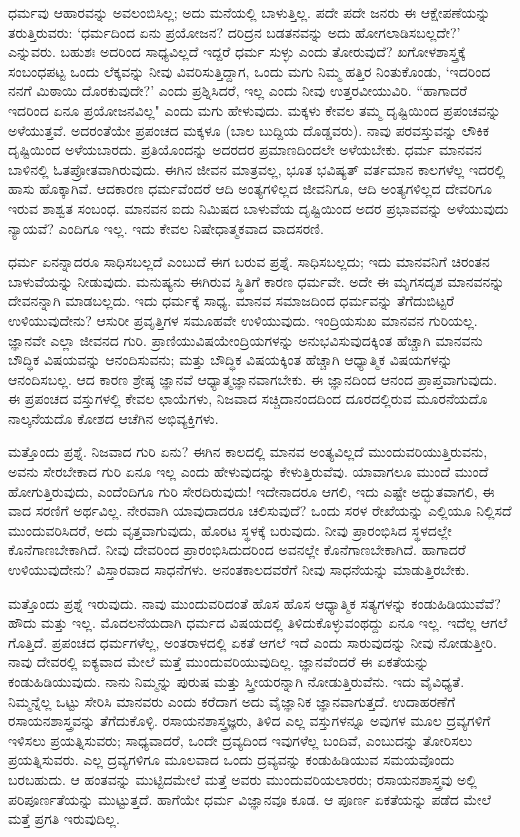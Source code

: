 ಧರ್ಮವು ಆಹಾರವನ್ನು ಅವಲಂಬಿಸಿಲ್ಲ; ಅದು ಮನೆಯಲ್ಲಿ ಬಾಳುತ್ತಿಲ್ಲ. ಪದೇ ಪದೇ ಜನರು ಈ ಆಕ್ಷೇಪಣೆಯನ್ನು ತರುತ್ತಿರುವರು: `ಧರ್ಮದಿಂದ ಏನು ಪ್ರಯೋಜನ? ದರಿದ್ರನ ಬಡತನವನ್ನು ಅದು ಹೋಗಲಾಡಿಸಬಲ್ಲದೇ?' ಎನ್ನುವರು. ಬಹುಶಃ ಅದರಿಂದ ಸಾಧ್ಯವಿಲ್ಲದೆ ಇದ್ದರೆ ಧರ್ಮ ಸುಳ್ಳು ಎಂದು ತೋರುವುದೆ? ಖಗೋಳಶಾಸ್ತ್ರಕ್ಕೆ ಸಂಬಂಧಪಟ್ಟ ಒಂದು ಲೆಕ್ಕವನ್ನು ನೀವು ವಿವರಿಸುತ್ತಿದ್ದಾಗ, ಒಂದು ಮಗು ನಿಮ್ಮ ಹತ್ತಿರ ನಿಂತುಕೊಂಡು, `ಇದರಿಂದ ನನಗೆ ಮಿಠಾಯಿ ದೊರಕುವುದೇ?' ಎಂದು ಪ್ರಶ್ನಿಸಿದರೆ, ಇಲ್ಲ ಎಂದು ನೀವು ಉತ್ತರವೀಯುವಿರಿ. “ಹಾಗಾದರೆ ಇದರಿಂದ ಏನೂ ಪ್ರಯೋಜನವಿಲ್ಲ" ಎಂದು ಮಗು ಹೇಳುವುದು. ಮಕ್ಕಳು ಕೇವಲ ತಮ್ಮ ದೃಷ್ಟಿಯಿಂದ ಪ್ರಪಂಚವನ್ನು ಅಳೆಯುತ್ತವೆ. ಅದರಂತೆಯೇ ಪ್ರಪಂಚದ ಮಕ್ಕಳೂ (ಬಾಲ ಬುದ್ದಿಯ ದೊಡ್ಡವರು). ನಾವು ಪರವಸ್ತುವನ್ನು ಲೌಕಿಕ ದೃಷ್ಟಿಯಿಂದ ಅಳೆಯಬಾರದು. ಪ್ರತಿಯೊಂದನ್ನು ಅದರದರ ಪ್ರಮಾಣದಿಂದಲೇ ಅಳೆಯಬೇಕು. ಧರ್ಮ ಮಾನವನ ಬಾಳಿನಲ್ಲಿ ಓತಪ್ರೋತವಾಗಿರುವುದು. ಈಗಿನ ಜೀವನ ಮಾತ್ರವಲ್ಲ, ಭೂತ ಭವಿಷ್ಯತ್ ವರ್ತಮಾನ ಕಾಲಗಳೆಲ್ಲ ಇದರಲ್ಲಿ ಹಾಸು ಹೊಕ್ಕಾಗಿವೆ. ಆದಕಾರಣ ಧರ್ಮವೆಂದರೆ ಆದಿ ಅಂತ್ಯಗಳಿಲ್ಲದ ಜೀವನಿಗೂ, ಆದಿ ಅಂತ್ಯಗಳಿಲ್ಲದ ದೇವರಿಗೂ ಇರುವ ಶಾಶ್ವತ ಸಂಬಂಧ. ಮಾನವನ ಐದು ನಿಮಿಷದ ಬಾಳುವೆಯ ದೃಷ್ಟಿಯಿಂದ ಅದರ ಪ್ರಭಾವವನ್ನು ಅಳೆಯುವುದು ನ್ಯಾಯವೆ? ಎಂದಿಗೂ ಇಲ್ಲ. ಇದು ಕೇವಲ ನಿಷೇಧಾತ್ಮಕವಾದ ವಾದಸರಣಿ.

ಧರ್ಮ ಏನನ್ನಾದರೂ ಸಾಧಿಸಬಲ್ಲದೆ ಎಂಬುದೆ ಈಗ ಬರುವ ಪ್ರಶ್ನೆ. ಸಾಧಿಸಬಲ್ಲದು; ಇದು ಮಾನವನಿಗೆ ಚಿರಂತನ ಬಾಳುವೆಯನ್ನು ನೀಡುವುದು. ಮನುಷ್ಯನು ಈಗಿರುವ ಸ್ಥಿತಿಗೆ ಕಾರಣ ಧರ್ಮವೇ. ಅದೇ ಈ ಮೃಗಸದೃಶ ಮಾನವನನ್ನು ದೇವನನ್ನಾಗಿ ಮಾಡಬಲ್ಲದು. ಇದು ಧರ್ಮಕ್ಕೆ ಸಾಧ್ಯ. ಮಾನವ ಸಮಾಜದಿಂದ ಧರ್ಮವನ್ನು ತೆಗೆದುಬಿಟ್ಟರೆ ಉಳಿಯುವುದೇನು? ಆಸುರೀ ಪ್ರವೃತ್ತಿಗಳ ಸಮೂಹವೇ ಉಳಿಯುವುದು. ಇಂದ್ರಿಯಸುಖ ಮಾನವನ ಗುರಿಯಲ್ಲ. ಜ್ಞಾನವೇ ಎಲ್ಲಾ ಜೀವನದ ಗುರಿ. ಪ್ರಾಣಿಯು\break ವಿಷಯೇಂದ್ರಿಯಗಳನ್ನು ಅನುಭವಿಸುವುದಕ್ಕಿಂತ ಹೆಚ್ಚಾಗಿ ಮಾನವನು ಬೌದ್ಧಿಕ ವಿಷಯವನ್ನು ಆನಂದಿಸುವನು; ಮತ್ತು ಬೌದ್ಧಿಕ ವಿಷಯಕ್ಕಿಂತ ಹೆಚ್ಚಾಗಿ ಆಧ್ಯಾತ್ಮಿಕ ವಿಷಯಗಳನ್ನು ಆನಂದಿಸಬಲ್ಲ. ಆದ ಕಾರಣ ಶ್ರೇಷ್ಠ ಜ್ಞಾನವೆ ಆಧ್ಯಾತ್ಮಜ್ಞಾನವಾಗಬೇಕು. ಈ ಜ್ಞಾನದಿಂದ ಆನಂದ ಪ್ರಾಪ್ತವಾಗುವುದು. ಈ ಪ್ರಪಂಚದ ವಸ್ತುಗಳಲ್ಲಿ ಕೇವಲ ಛಾಯೆಗಳು, ನಿಜವಾದ ಸಚ್ಚಿದಾನಂದದಿಂದ ದೂರದಲ್ಲಿರುವ ಮೂರನೆಯದೊ ನಾಲ್ಕನೆಯದೊ ಕೋಶದ ಆಚೆಗಿನ ಅಭಿವ್ಯಕ್ತಿಗಳು.

ಮತ್ತೊಂದು ಪ್ರಶ್ನೆ. ನಿಜವಾದ ಗುರಿ ಏನು? ಈಗಿನ ಕಾಲದಲ್ಲಿ ಮಾನವ ಅಂತ್ಯವಿಲ್ಲದೆ ಮುಂದುವರಿಯುತ್ತಿರುವನು, ಅವನು ಸೇರಬೇಕಾದ ಗುರಿ ಏನೂ ಇಲ್ಲ ಎಂದು ಹೇಳುವುದನ್ನು ಕೇಳುತ್ತಿರುವೆವು. ಯಾವಾಗಲೂ ಮುಂದೆ ಮುಂದೆ ಹೋಗುತ್ತಿರುವುದು, ಎಂದೆಂದಿಗೂ ಗುರಿ ಸೇರದಿರುವುದು! ಇದೇನಾದರೂ ಆಗಲಿ, ಇದು ಎಷ್ಟೇ ಅದ್ಭುತವಾಗಲಿ, ಈ ವಾದ ಸರಣಿಗೆ ಅರ್ಥವಿಲ್ಲ. ನೇರವಾಗಿ ಯಾವುದಾದರೂ ಚಲಿಸುವುದೆ? ಒಂದು ಸರಳ ರೇಖೆಯನ್ನು ಎಲ್ಲಿಯೂ ನಿಲ್ಲಿಸದೆ ಮುಂದುವರಿಸಿದರೆ, ಅದು ವೃತ್ತವಾಗುವುದು, ಹೊರಟ ಸ್ಥಳಕ್ಕೆ ಬರುವುದು. ನೀವು ಪ್ರಾರಂಭಿಸಿದ ಸ್ಥಳದಲ್ಲೇ ಕೊನೆಗಾಣಬೇಕಾಗಿದೆ. ನೀವು ದೇವರಿಂದ ಪ್ರಾರಂಭಿಸಿದುದರಿಂದ ಅವನಲ್ಲೇ ಕೊನೆಗಾಣಬೇಕಾಗಿದೆ. ಹಾಗಾದರೆ ಉಳಿಯುವುದೇನು? ವಿಸ್ತಾರವಾದ ಸಾಧನೆಗಳು. ಅನಂತಕಾಲದವರೆಗೆ ನೀವು ಸಾಧನೆಯನ್ನು ಮಾಡುತ್ತಿರಬೇಕು.

ಮತ್ತೊಂದು ಪ್ರಶ್ನೆ ಇರುವುದು. ನಾವು ಮುಂದುವರಿದಂತೆ ಹೊಸ ಹೊಸ ಆಧ್ಯಾತ್ಮಿಕ ಸತ್ಯಗಳನ್ನು ಕಂಡುಹಿಡಿಯುವೆವೆ? ಹೌದು ಮತ್ತು ಇಲ್ಲ. ಮೊದಲನೆಯದಾಗಿ ಧರ್ಮದ ವಿಷಯದಲ್ಲಿ ತಿಳಿದುಕೊಳ್ಳುವಂಥದ್ದು ಏನೂ ಇಲ್ಲ. ಇದೆಲ್ಲ ಆಗಲೆ ಗೊತ್ತಿದೆ. ಪ್ರಪಂಚದ ಧರ್ಮಗಳೆಲ್ಲ, ಅಂತರಾಳದಲ್ಲಿ ಏಕತೆ ಆಗಲೆ ಇದೆ ಎಂದು ಸಾರುವುದನ್ನು ನೀವು ನೋಡುತ್ತೀರಿ. ನಾವು ದೇವರಲ್ಲಿ ಐಕ್ಯವಾದ ಮೇಲೆ ಮತ್ತೆ ಮುಂದುವರಿಯುವುದಿಲ್ಲ. ಜ್ಞಾನವೆಂದರೆ ಈ ಏಕತೆಯನ್ನು ಕಂಡುಹಿಡಿಯುವುದು. ನಾನು ನಿಮ್ಮನ್ನು ಪುರುಷ ಮತ್ತು ಸ್ತ್ರೀಯರನ್ನಾಗಿ ನೋಡುತ್ತಿರುವೆನು. ಇದು ವೈವಿಧ್ಯತೆ. ನಿಮ್ಮನ್ನೆಲ್ಲ ಒಟ್ಟು ಸೇರಿಸಿ ಮಾನವರು ಎಂದು ಕರೆದಾಗ ಅದು ವೈಜ್ಞಾನಿಕ ಜ್ಞಾನವಾಗುತ್ತದೆ. ಉದಾಹರಣೆಗೆ ರಸಾಯನಶಾಸ್ತ್ರವನ್ನು ತೆಗೆದುಕೊಳ್ಳಿ. ರಸಾಯನಶಾಸ್ತ್ರಜ್ಞರು, ತಿಳಿದ ಎಲ್ಲ ವಸ್ತುಗಳನ್ನೂ ಅವುಗಳ ಮೂಲ ದ್ರವ್ಯಗಳಿಗೆ ಇಳಿಸಲು ಪ್ರಯತ್ನಿಸುವರು; ಸಾಧ್ಯವಾದರೆ, ಒಂದೇ ದ್ರವ್ಯದಿಂದ ಇವುಗಳೆಲ್ಲ ಬಂದಿವೆ, ಎಂಬುದನ್ನು ತೋರಿಸಲು ಪ್ರಯತ್ನಿಸುವರು. ಎಲ್ಲ ದ್ರವ್ಯಗಳಿಗೂ ಮೂಲವಾದ ಒಂದು ದ್ರವ್ಯವನ್ನು ಕಂಡುಹಿಡಿಯುವ ಸಮಯವೊಂದು ಬರಬಹುದು. ಆ ಹಂತವನ್ನು ಮುಟ್ಟಿದಮೇಲೆ ಮತ್ತೆ ಅವರು ಮುಂದುವರಿಯಲಾರರು; ರಸಾಯನಶಾಸ್ತ್ರವು ಅಲ್ಲಿ ಪರಿಪೂರ್ಣತೆಯನ್ನು ಮುಟ್ಟುತ್ತದೆ. ಹಾಗೆಯೇ ಧರ್ಮ ವಿಜ್ಞಾನವೂ ಕೂಡ. ಆ ಪೂರ್ಣ ಏಕತೆಯನ್ನು ಪಡೆದ ಮೇಲೆ ಮತ್ತೆ ಪ್ರಗತಿ ಇರುವುದಿಲ್ಲ.


